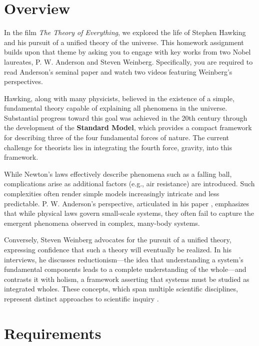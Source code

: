 \documentclass[a4paper,12pt]{article}
\begin{document}
\section*{Overview}

In the film \textit{The Theory of Everything}, we explored the life of Stephen Hawking and his pursuit of a unified theory of the universe. This homework assignment builds upon that theme by asking you to engage with key works from two Nobel laureates, P. W. Anderson and Steven Weinberg. Specifically, you are required to read Anderson's seminal paper \cite{doi:10.1126/science.177.4047.393} and watch two videos \cite{Weinberg2021, Weinberg2021Part2} featuring Weinberg's perspectives.

Hawking, along with many physicists, believed in the existence of a simple, fundamental theory capable of explaining all phenomena in the universe. Substantial progress toward this goal was achieved in the 20th century through the development of the \textbf{Standard Model}, which provides a compact framework for describing three of the four fundamental forces of nature. The current challenge for theorists lies in integrating the fourth force, gravity, into this framework.

While Newton’s laws effectively describe phenomena such as a falling ball, complications arise as additional factors (e.g., air resistance) are introduced. Such complexities often render simple models increasingly intricate and less predictable. P. W. Anderson’s perspective, articulated in his paper \cite{doi:10.1126/science.177.4047.393}, emphasizes that while physical laws govern small-scale systems, they often fail to capture the emergent phenomena observed in complex, many-body systems.

Conversely, Steven Weinberg advocates for the pursuit of a unified theory, expressing confidence that such a theory will eventually be realized. In his interviews, he discusses reductionism—the idea that understanding a system’s fundamental components leads to a complete understanding of the whole—and contrasts it with holism, a framework asserting that systems must be studied as integrated wholes. These concepts, which span multiple scientific disciplines, represent distinct approaches to scientific inquiry \cite{WikipediaReductionism, WikipediaHolism}.

\section*{Requirements}
\end{document}
